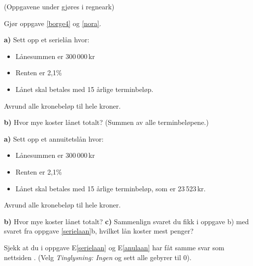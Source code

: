 



{} 

\opgt

(Oppgavene under gjøres i regneark) \vsk

Gjør oppgave \ref{borge4} og \ref{nora}.

\textbf{a)} Sett opp et serielån hvor:
\begin{itemize}
	\item Lånesummen er 300\,000\,kr
	\item Renten er 2,1\%
	\item Lånet skal betales med 15 årlige terminbeløp.
\end{itemize}
Avrund alle kronebeløp til hele kroner.\os

\textbf{b)} Hvor mye koster lånet totalt? (Summen av alle terminbeløpene.)

\textbf{a)} Sett opp et annuitetslån hvor:
\begin{itemize}
	\item Lånesummen er 300\,000\,kr
	\item Renten er 2,1\%
	\item Lånet skal betales med 15 årlige terminbeløp, som er 23\,523\,kr.
\end{itemize}
Avrund alle kronebeløp til hele kroner.\os

\textbf{b)} Hvor mye koster lånet totalt? \os
\textbf{c)} Sammenlign svaret du fikk i oppgave b) med svaret fra oppgave \ref{serielaan}b, hvilket lån koster mest penger?\os

Sjekk at du i oppgave E\ref{serielaan} og E\ref{anulaan} har fåt samme svar som nettsiden . (Velg \textsl{Tinglysning: Ingen} og sett alle gebyrer til 0).


